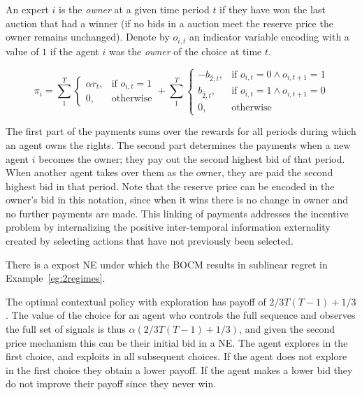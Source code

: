 \begin{mech}
An expert $i$ is the \emph{owner} at a given time period $t$ if they have won the last auction that had a winner (if no bids in a auction meet the reserve price the owner remains unchanged). 
Denote by $o_{i,t}$ an indicator variable encoding with a value of $1$ if the agent $i$ was the \emph{owner} of the choice at time $t$. 

\[
    \pi_i =  \sum_1^T
\begin{cases}
    \alpha r_t ,& \text{if } o_{i,t} = 1\\
    0,              & \text{otherwise}
\end{cases}
+
\sum_1^T
\begin{cases}
     - b_{\hat{2},t} ,& \text{if } o_{i,t} = 0 \land o_{i,t+1} = 1\\
      b_{\hat{2},t} ,& \text{if } o_{i,t}= 1 \land o_{i,t+1} = 0 \\
		0,              & \text{otherwise}
\end{cases}
\]

\end{mech}


The first part of the payments sums over the rewards for all periods during which an agent owns the rights.
The second part determines the payments when a new agent $i$ becomes the owner; they pay out the second highest bid of that period. 
When another agent takes over them as the owner, they are paid the second highest bid in that period.
Note that the reserve price can be encoded in the owner's bid in this notation, since when it wins there is no change in owner and no further payments are made. 
This linking of payments addresses the incentive problem by internalizing the positive inter-temporal information externality created by selecting actions that have not previously been selected.


\begin{prop}
There is a expost NE under which the BOCM  results in sublinear regret in Example~\ref{eg:2regimes}. 
\end{prop}


The optimal contextual policy with exploration has payoff of $2/3T(T-1) + 1/3$. The value of the choice for an agent who controls the full sequence and observes the full set of signals is thus $\alpha (2/3T(T-1) + 1/3)$, and given the second price mechanism this can be their initial bid in a NE.
The agent explores in the first choice, and exploits in all subsequent choices. If the agent does not explore in the first choice they obtain a lower payoff. If the agent makes a lower bid they do not improve their payoff since they never win.


